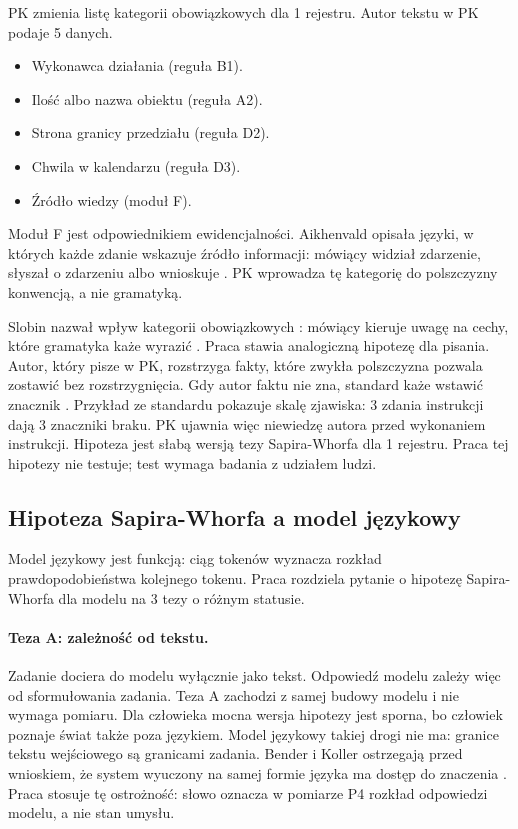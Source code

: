 PK zmienia listę kategorii obowiązkowych dla 1 rejestru. Autor tekstu w PK podaje 5 danych.
\begin{itemize}[leftmargin=1.6em,itemsep=0pt]
  \item Wykonawca działania (reguła B1).
  \item Ilość albo nazwa obiektu (reguła A2).
  \item Strona granicy przedziału (reguła D2).
  \item Chwila w kalendarzu (reguła D3).
  \item Źródło wiedzy (moduł F).
\end{itemize}
Moduł F jest odpowiednikiem ewidencjalności. Aikhenvald opisała języki, w których każde zdanie wskazuje źródło
informacji: mówiący widział zdarzenie, słyszał o zdarzeniu albo wnioskuje
\cite{aikhenvald2004}. PK wprowadza tę kategorię do polszczyzny konwencją, a nie gramatyką.

Slobin nazwał wpływ kategorii obowiązkowych : mówiący kieruje
uwagę na cechy, które gramatyka każe wyrazić \cite{slobin1996}. Praca stawia analogiczną
hipotezę dla pisania. Autor, który pisze w PK, rozstrzyga fakty, które zwykła polszczyzna
pozwala zostawić bez rozstrzygnięcia. Gdy autor faktu nie zna, standard każe wstawić
znacznik \pkq{[DO USTALENIA]}. Przykład ze standardu pokazuje skalę zjawiska: 3 zdania
instrukcji dają 3 znaczniki braku. PK ujawnia więc niewiedzę autora przed wykonaniem
instrukcji. Hipoteza jest słabą wersją tezy Sapira-Whorfa dla 1 rejestru. Praca tej
hipotezy nie testuje; test wymaga badania z udziałem ludzi.

\subsection{Hipoteza Sapira-Whorfa a model językowy}
\label{sec:swllm}

Model językowy jest funkcją: ciąg tokenów wyznacza rozkład prawdopodobieństwa kolejnego
tokenu. Praca rozdziela pytanie o hipotezę Sapira-Whorfa dla modelu na 3 tezy o różnym
statusie.

\paragraph{Teza A: zależność od tekstu.}
Zadanie dociera do modelu wyłącznie jako tekst. Odpowiedź modelu zależy więc od
sformułowania zadania. Teza A zachodzi z samej budowy modelu i nie wymaga pomiaru.
Dla człowieka mocna wersja hipotezy jest sporna, bo człowiek poznaje świat także poza
językiem. Model językowy takiej drogi nie ma: granice tekstu wejściowego są granicami
zadania. Bender i Koller ostrzegają przed wnioskiem, że system wyuczony na samej formie
języka ma dostęp do znaczenia \cite{bender2020}. Praca stosuje tę ostrożność: słowo
 oznacza w pomiarze P4 rozkład odpowiedzi modelu, a nie stan umysłu.

